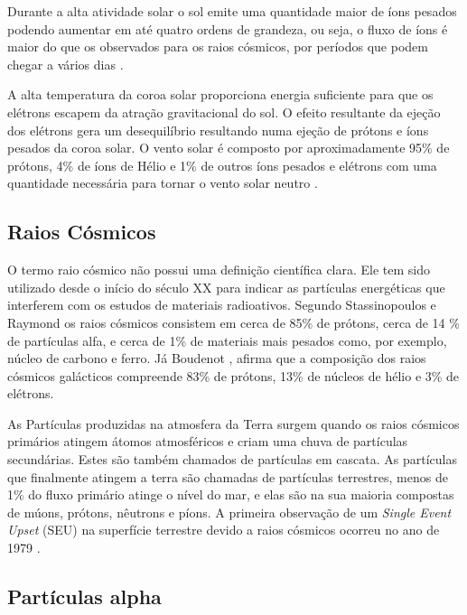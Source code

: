 \documentclass[a4paper,12pt,brazil]{ufms-cpcx}
\begin{document}
Durante a alta atividade solar o sol emite uma quantidade maior de íons pesados podendo aumentar em até quatro ordens de grandeza, ou seja, o fluxo de íons é maior do que os observados para os raios cósmicos, por períodos que podem chegar a vários dias \cite{Stassinopoulos:1988}. 

A alta temperatura da coroa solar proporciona energia suficiente para que os elétrons escapem da atração gravitacional do sol. O efeito resultante da ejeção dos elétrons gera um desequilíbrio resultando numa ejeção de prótons e íons pesados da coroa solar. O vento solar é composto por aproximadamente 95\% de prótons, 4\% de íons de Hélio e 1\% de outros íons pesados e elétrons com uma quantidade necessária para tornar o vento solar neutro \cite{Velazco:2007}. 

 

\subsection{Raios Cósmicos} \label{subsec: raiosCosmicos}

O termo raio cósmico não possui uma definição científica clara. Ele tem sido utilizado desde o início do século XX para indicar as partículas energéticas que interferem com os estudos de materiais radioativos. Segundo Stassinopoulos e Raymond \cite{Stassinopoulos:1988} os raios cósmicos consistem em cerca de 85\% de prótons, cerca de 14 \% de partículas alfa, e cerca de 1\% de materiais mais pesados como, por exemplo, núcleo de carbono e ferro. Já Boudenot \cite{Boudenot:2007}, afirma que a composição dos raios cósmicos galácticos compreende 83\% de prótons, 13\% de núcleos de hélio e 3\% de elétrons. 

As Partículas produzidas na atmosfera da Terra surgem quando os raios cósmicos primários atingem átomos atmosféricos e criam uma chuva de partículas secundárias. Estes são também chamados de partículas em cascata. As partículas que finalmente atingem a terra são chamadas de partículas terrestres, menos de 1\% do fluxo primário atinge o nível do mar, e elas são na sua maioria compostas de múons, prótons, nêutrons e píons. A primeira observação de um \textit{Single Event Upset} (SEU) na superfície terrestre devido a raios cósmicos ocorreu no ano de 1979 \cite{ZieglerLandFord:1979}.


\subsection{Partículas alpha}
\end{document}

